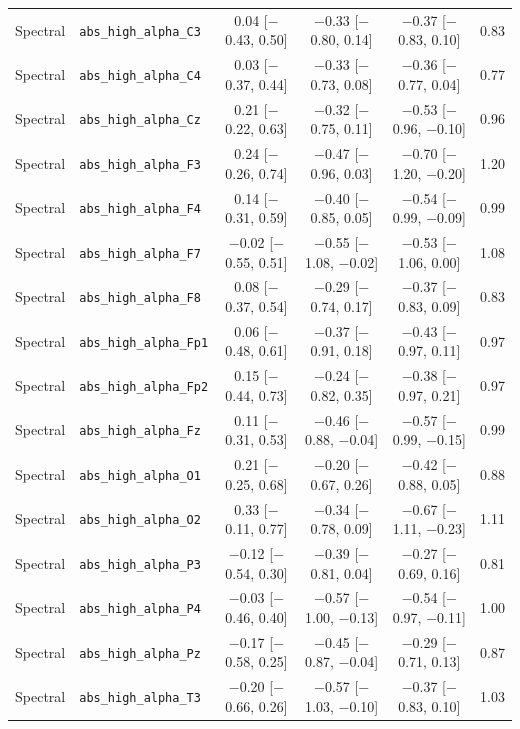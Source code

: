 {\begin{longtable}{llcccc}
Spectral & \texttt{abs\_high\_alpha\_C3} & 0.04 [$-$0.43, 0.50] & $-$0.33 [$-$0.80, 0.14] & $-$0.37 [$-$0.83, 0.10] & 0.83 \\
Spectral & \texttt{abs\_high\_alpha\_C4} & 0.03 [$-$0.37, 0.44] & $-$0.33 [$-$0.73, 0.08] & $-$0.36 [$-$0.77, 0.04] & 0.77 \\
Spectral & \texttt{abs\_high\_alpha\_Cz} & 0.21 [$-$0.22, 0.63] & $-$0.32 [$-$0.75, 0.11] & $-$0.53 [$-$0.96, $-$0.10] & 0.96 \\
Spectral & \texttt{abs\_high\_alpha\_F3} & 0.24 [$-$0.26, 0.74] & $-$0.47 [$-$0.96, 0.03] & $-$0.70 [$-$1.20, $-$0.20] & 1.20 \\
Spectral & \texttt{abs\_high\_alpha\_F4} & 0.14 [$-$0.31, 0.59] & $-$0.40 [$-$0.85, 0.05] & $-$0.54 [$-$0.99, $-$0.09] & 0.99 \\
Spectral & \texttt{abs\_high\_alpha\_F7} & $-$0.02 [$-$0.55, 0.51] & $-$0.55 [$-$1.08, $-$0.02] & $-$0.53 [$-$1.06, 0.00] & 1.08 \\
Spectral & \texttt{abs\_high\_alpha\_F8} & 0.08 [$-$0.37, 0.54] & $-$0.29 [$-$0.74, 0.17] & $-$0.37 [$-$0.83, 0.09] & 0.83 \\
Spectral & \texttt{abs\_high\_alpha\_Fp1} & 0.06 [$-$0.48, 0.61] & $-$0.37 [$-$0.91, 0.18] & $-$0.43 [$-$0.97, 0.11] & 0.97 \\
Spectral & \texttt{abs\_high\_alpha\_Fp2} & 0.15 [$-$0.44, 0.73] & $-$0.24 [$-$0.82, 0.35] & $-$0.38 [$-$0.97, 0.21] & 0.97 \\
Spectral & \texttt{abs\_high\_alpha\_Fz} & 0.11 [$-$0.31, 0.53] & $-$0.46 [$-$0.88, $-$0.04] & $-$0.57 [$-$0.99, $-$0.15] & 0.99 \\
Spectral & \texttt{abs\_high\_alpha\_O1} & 0.21 [$-$0.25, 0.68] & $-$0.20 [$-$0.67, 0.26] & $-$0.42 [$-$0.88, 0.05] & 0.88 \\
Spectral & \texttt{abs\_high\_alpha\_O2} & 0.33 [$-$0.11, 0.77] & $-$0.34 [$-$0.78, 0.09] & $-$0.67 [$-$1.11, $-$0.23] & 1.11 \\
Spectral & \texttt{abs\_high\_alpha\_P3} & $-$0.12 [$-$0.54, 0.30] & $-$0.39 [$-$0.81, 0.04] & $-$0.27 [$-$0.69, 0.16] & 0.81 \\
Spectral & \texttt{abs\_high\_alpha\_P4} & $-$0.03 [$-$0.46, 0.40] & $-$0.57 [$-$1.00, $-$0.13] & $-$0.54 [$-$0.97, $-$0.11] & 1.00 \\
Spectral & \texttt{abs\_high\_alpha\_Pz} & $-$0.17 [$-$0.58, 0.25] & $-$0.45 [$-$0.87, $-$0.04] & $-$0.29 [$-$0.71, 0.13] & 0.87 \\
Spectral & \texttt{abs\_high\_alpha\_T3} & $-$0.20 [$-$0.66, 0.26] & $-$0.57 [$-$1.03, $-$0.10] & $-$0.37 [$-$0.83, 0.10] & 1.03 \\

\end{longtable}}
